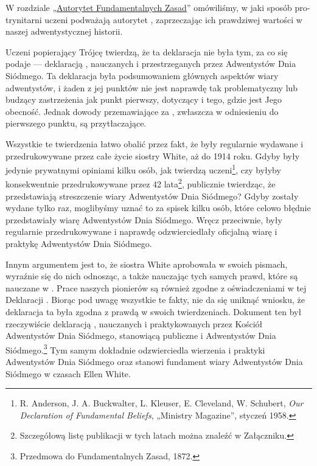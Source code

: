 W rozdziale „\hyperref[chap:authority]{Autorytet Fundamentalnych Zasad}” omówiliśmy, w jaki sposób pro-trynitarni uczeni podważają autorytet , zaprzeczając ich prawdziwej wartości w naszej adwentystycznej historii.

Uczeni popierający Trójcę twierdzą, że ta deklaracja nie była tym, za co się podaje — deklaracją , nauczanych i przestrzeganych przez Adwentystów Dnia Siódmego. Ta deklaracja była podsumowaniem głównych aspektów wiary adwentystów, i żaden z jej punktów nie jest naprawdę tak problematyczny lub budzący zastrzeżenia jak  punkt pierwszy, dotyczący  i tego, gdzie jest Jego obecność. Jednak dowody przemawiające za  , zwłaszcza w odniesieniu do pierwszego punktu, są przytłaczające.

Wszystkie te twierdzenia łatwo obalić przez fakt, że  były regularnie wydawane i przedrukowywane przez całe życie siostry White, aż do 1914 roku. Gdyby były jedynie prywatnymi opiniami kilku osób, jak twierdzą uczeni\footnote{R. Anderson, J. A. Buckwalter, L. Kleuser, E. Cleveland, W. Schubert, \textit{Our Declaration of Fundamental Beliefs}, „Ministry Magazine”, styczeń 1958.}, czy byłyby konsekwentnie przedrukowywane przez 42 lata\footnote{Szczegółową listę publikacji w tych latach można znaleźć w Załączniku.}, publicznie twierdząc, że przedstawiają streszczenie wiary Adwentystów Dnia Siódmego? Gdyby zostały wydane tylko raz, moglibyśmy uznać to za spisek kilku osób, które celowo błędnie przedstawiały wiarę Adwentystów Dnia Siódmego. Wręcz przeciwnie,  były regularnie przedrukowywane i naprawdę odzwierciedlały oficjalną wiarę i praktykę Adwentystów Dnia Siódmego.

Innym argumentem jest to, że siostra White aprobowała  w swoich pismach, wyraźnie się do nich odnosząc, a także nauczając tych samych prawd, które są nauczane w . Prace naszych pionierów są również zgodne z oświadczeniami w tej Deklaracji . Biorąc pod uwagę wszystkie te fakty, nie da się uniknąć wniosku, że deklaracja ta była zgodna z prawdą w swoich twierdzeniach. Dokument ten był rzeczywiście deklaracją , nauczanych i praktykowanych przez Kościół Adwentystów Dnia Siódmego, stanowiącą publiczne  i  Adwentystów Dnia Siódmego.\footnote{Przedmowa do Fundamentalnych Zasad, 1872.} Tym samym dokładnie odzwierciedla wierzenia i praktyki Adwentystów Dnia Siódmego oraz stanowi fundament wiary Adwentystów Dnia Siódmego w czasach Ellen White.


